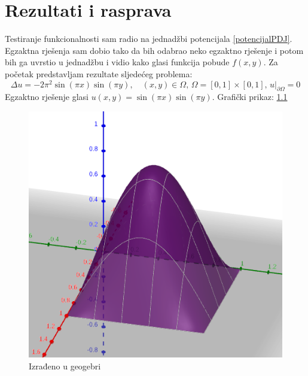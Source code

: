 \documentclass[zavrsnirad]{../fer}
\begin{document}
\chapter{Rezultati i rasprava}
\label{pog:rezultati_i_rasprava}
Testiranje funkcionalnosti sam radio na jednadžbi 
potencijala \ref{potencijalPDJ}. 
Egzaktna rješenja sam dobio tako da bih odabrao neko egzaktno rješenje i 
potom bih ga uvrstio u jednadžbu i vidio kako glasi funkcija pobude $f(x,y)$.
Za početak predstavljam rezultate sljedećeg problema:
\begin{equation}
  \Delta u = - 2  \pi^2 \sin{(\pi x)}\sin{(\pi y)}, \quad (x,y) \in \Omega,
  \, \Omega = [0,1] \times [0,1], \, u |_{ \partial \Omega} = 0
\end{equation}
Egzaktno rješenje glasi $u(x,y) = \sin{(\pi x)}\sin{(\pi y)}$. 
Grafički prikaz: \ref{sinsinEgz}
\bigskip
\begin{figure}[H]
	\centering
	\includegraphics[width=0.75\linewidth]{Figures/sinsinEgz.png}
	\caption{Izrađeno u geogebri}
  \label{sinsinEgz}
\end{figure}
\end{document}
